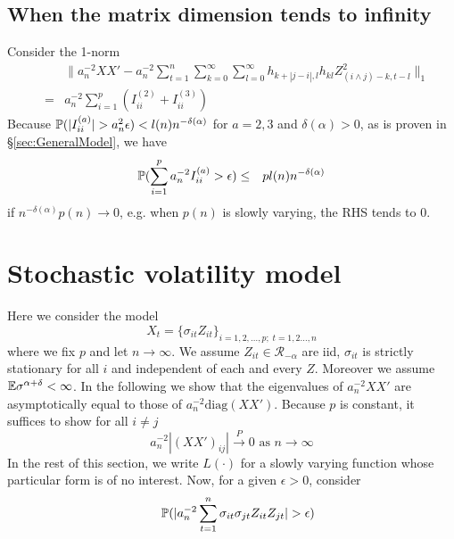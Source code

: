 \documentclass{article}
\begin{document}
\subsection{When the matrix dimension tends to infinity}
Consider the 1-norm
\begin{eqnarray*}
  && \| a_n^{-2} XX' - a_n^{-2} \sum_{t=1}^n
     \sum_{k=0}^\infty \sum_{l=0}^\infty
     h_{k+|j-i|,l} h_{kl} Z_{(i \wedge j) -k, t-l}^2\|_1 \\
  &=& a_n^{-2} \sum_{i=1}^p (I^{(2)}_{ii} + I^{(3)}_{ii})
\end{eqnarray*}
Because $\P(|I^{(a)}_{ii}| > a_n^2 \epsilon) < l(n)
n^{-\delta(\alpha)}$ for $a = 2,3$ and $\delta(\alpha) > 0$, as is
proven in \S\ref{sec:GeneralModel}, we have
\begin{eqnarray*}
  \P(\sum_{i=1}^p a_n^{-2} I^{(a)}_{ii} > \epsilon) &\leq& p l(n)
  n^{-\delta(\alpha)}
\end{eqnarray*}
if $n^{-\delta(\alpha)} p(n) \to 0$, e.g. when $p(n)$ is slowly varying, the RHS
tends to 0.

\section{Stochastic volatility model}
Here we consider the model
$$
X_t = \{\sigma_{it} Z_{it}\}_{i=1,2,\dots,p;\; t=1,2\dots,n}
$$
where we fix $p$ and let $n \to \infty$. We assume $Z_{it} \in
\mathcal R_{-\alpha}$ are iid, $\sigma_{it}$ is strictly stationary
for all $i$ and independent of each and every $Z$. Moreover we assume
$\E \sigma^{\alpha + \delta} < \infty$. In the following we show that
the eigenvalues of $a_n^{-2} XX'$ are asymptotically equal to those of
$a_n^{-2} \text{diag}(XX')$. Because $p$ is constant, it suffices to
show for all $i \neq j$
$$
a_n^{-2}|(XX')_{ij}| \overset{P}{\to} 0 \text{ as } n \to \infty
$$
In the rest of this section, we write $L(\cdot)$ for a slowly varying
function whose particular form is of no interest. Now, for a given
$\epsilon > 0$, consider
\begin{eqnarray*}
&& \P(|a_n^{-2} \sum_{t=1}^n \sigma_{it}\sigma_{jt} Z_{it} Z_{jt}| > \epsilon)
\end{eqnarray*}
\end{document}
